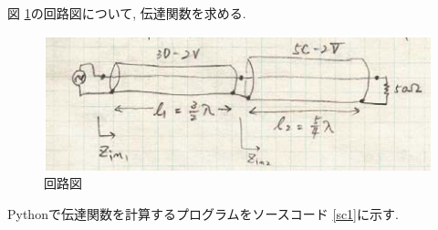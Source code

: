 \documentclass[a4j,12pt,]{jarticle}
\begin{document}
図 \ref{p2}の回路図について, 伝達関数を求める.

\begin{figure}[H]
  \begin{center}
    \includegraphics[width=140mm]{p2.png}
    \caption{回路図}
    \label{p2}
  \end{center}
\end{figure}

Pythonで伝達関数を計算するプログラムをソースコード \ref{sc1}に示す.
\end{document}
